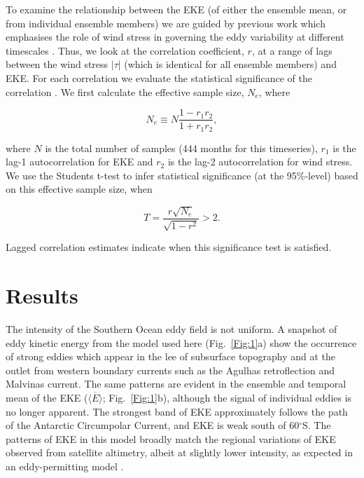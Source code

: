 \documentclass[linenumbers]{agujournal2019}
\begin{document}
To examine the relationship between the EKE (of either the ensemble mean, or from individual ensemble members) we are guided by previous work which emphasises the role of wind stress in governing the eddy variability at different timescales \citep[e.g.][]{Hogg2015, Sinha2016}.
Thus, we look at the correlation coefficient, $r$, at a range of lags between the wind stress $|\tau|$ (which is identical for all ensemble members) and EKE.
For each correlation we evaluate the statistical significance of the correlation \citep[following, e.g.][]{Santer2000}.
We first calculate the effective sample size, $N_e$, where
\begin{linenomath*}
\begin{equation}
N_e \equiv N \frac{1-r_1 r_2}{1+r_1 r_2},
\end{equation}
\end{linenomath*}
where $N$ is the total number of samples (444 months for this timeseries), $r_1$ is the lag-1 autocorrelation for EKE and $r_2$ is the lag-2 autocorrelation for wind stress.
We use the Students t-test to infer statistical significance (at the 95\%-level) based on this effective sample size, when
\begin{linenomath*}
\begin{equation}
T = \frac{r \sqrt{N_e}}{\sqrt{1-r^2}} > 2.
\end{equation}
\end{linenomath*}
Lagged correlation estimates indicate when this significance test is satisfied.

\section{Results}

The intensity of the Southern Ocean eddy field is not uniform.
A snapshot of eddy kinetic energy from the model used here (Fig.~\ref{Fig:1}a) show the occurrence of strong eddies which appear in the lee of subsurface topography and at the outlet from western boundary currents such as the Agulhas retroflection and Malvinas current.
The same patterns are evident in the ensemble and temporal mean of the EKE ($\overline{\langle E \rangle}$; Fig.~\ref{Fig:1}b), although the signal of individual eddies is no longer apparent.
The strongest band of EKE approximately follows the path of the Antarctic Circumpolar Current, and EKE is weak south of 60$^\circ$S.
The patterns of EKE in this model broadly match the regional variations of EKE observed from satellite altimetry, albeit at slightly lower intensity, as expected in an eddy-permitting model \citep[e.g.][]{Kiss2020}.
\end{document}
